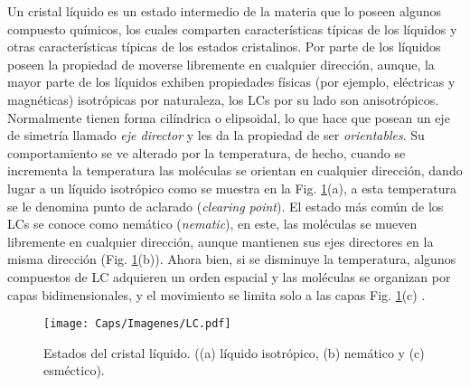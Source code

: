Un cristal líquido es un estado intermedio de la materia que lo poseen algunos compuesto químicos, los cuales comparten características típicas de los líquidos y otras características típicas de los estados cristalinos. Por parte de los líquidos poseen la propiedad de moverse libremente en cualquier dirección, aunque, la mayor parte de los líquidos exhiben propiedades físicas (por ejemplo, eléctricas y magnéticas) isotrópicas por naturaleza, los LCs por su lado son anisotrópicos. Normalmente tienen forma cilíndrica o elipsoidal, lo que hace que posean un eje de simetría llamado \textit{eje director}  y les da la propiedad de ser  \textit{orientables}. Su comportamiento se ve alterado por la temperatura, de hecho, cuando se incrementa la temperatura las moléculas se orientan en cualquier dirección, dando lugar a un líquido isotrópico como se muestra en la Fig. \ref{fig:LC}(a), a esta temperatura se le denomina punto de aclarado (\textit{clearing point}). El estado más común de los LCs se conoce como nemático (\textit{nematic}), en este, las moléculas se mueven libremente en cualquier dirección, aunque mantienen sus ejes directores en la misma dirección (Fig. \ref{fig:LC}(b)). Ahora bien, si se disminuye la temperatura, algunos compuestos de LC adquieren un orden espacial y las moléculas se organizan por capas bidimensionales, y el movimiento se limita solo a las capas Fig. \ref{fig:LC}(c) \cite{Uribe2011}.\\


\begin{figure}[!ht]
  \centering
    \texttt{[image: Caps/Imagenes/LC.pdf]}
  \caption[Estados del cristal líquido.]{Estados del cristal líquido. ((a) líquido isotrópico, (b) nemático y (c) esméctico).}
  \label{fig:LC}
\end{figure}

